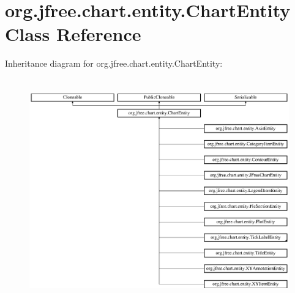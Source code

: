 \hypertarget{classorg_1_1jfree_1_1chart_1_1entity_1_1_chart_entity}{}\section{org.\+jfree.\+chart.\+entity.\+Chart\+Entity Class Reference}
\label{classorg_1_1jfree_1_1chart_1_1entity_1_1_chart_entity}
Inheritance diagram for org.\+jfree.\+chart.\+entity.\+Chart\+Entity\+:\begin{figure}[H]
\begin{center}
\leavevmode
\includegraphics[height=9.745649cm]{classorg_1_1jfree_1_1chart_1_1entity_1_1_chart_entity}
\end{center}
\end{figure}

